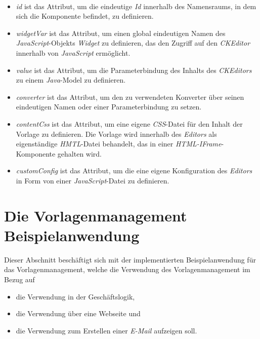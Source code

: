 \ \begin{itemize}
	\item\emph{id} 
	\newline
	ist das Attribut, um die eindeutige \emph{Id} innerhalb des Namensraums, in dem sich die Komponente befindet, zu definieren.
	\item\emph{widgetVar}
	\newline
	ist das Attribut, um einen global eindeutigen Namen des \emph{JavaScript}-Objekts \emph{Widget} zu definieren, das den Zugriff auf den \emph{CKEditor} innerhalb von \emph{JavaScript} ermöglicht.
	\item\emph{value}
	\newline
	ist das Attribut, um die Parameterbindung des Inhalts des \emph{CKEditors} zu einem \emph{Java}-Model zu definieren.
	\item\emph{converter}
	\newline
	ist das Attribut, um den zu verwendeten Konverter über seinen eindeutigen Namen oder einer Parameterbindung zu setzen.
	\item\emph{contentCss}
	\newline
	ist das Attribut, um eine eigene \emph{CSS}-Datei für den Inhalt der Vorlage zu definieren. Die Vorlage wird innerhalb des \emph{Editors} als eigenständige \emph{HMTL}-Datei behandelt, das in einer \emph{HTML-IFrame}-Komponente gehalten wird.
	\item\emph{customConfig}
	\newline
	ist das Attribut, um die eine eigene Konfiguration des \emph{Editors} in Form von einer \emph{JavaScript}-Datei zu definieren. 
\end{itemize}

\section{Die Vorlagenmanagement Beispielanwendung}
Dieser Abschnitt beschäftigt sich mit der implementierten Beispielanwendung für das Vorlagenmanagement, welche die Verwendung des Vorlagenmanagement im Bezug auf 
\begin{itemize}
	\item die Verwendung in der Geschäftslogik,
	\item die Verwendung über eine Webseite und
	\item die Verwendung zum Erstellen einer \emph{E-Mail} aufzeigen soll. 
\end{itemize}

